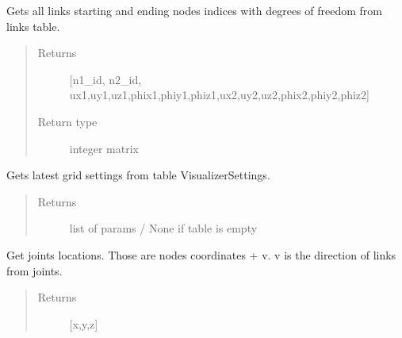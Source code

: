 \documentclass[letterpaper,10pt,english]{sphinxmanual}
\begin{document}
\begin{fulllineitems}
\begin{fulllineitems}
\end{fulllineitems}


\begin{fulllineitems}
\label{\detokenize{api:beamon.database.Database.get_edof_for_simulation}}
Gets all links starting and ending nodes indices with degrees of freedom from links table.
\begin{quote}\begin{description}
\item[{Returns}] \leavevmode
{[}n1\_id, n2\_id, ux1,uy1,uz1,phix1,phiy1,phiz1,ux2,uy2,uz2,phix2,phiy2,phiz2{]}

\item[{Return type}] \leavevmode
integer matrix

\end{description}\end{quote}

\end{fulllineitems}


\begin{fulllineitems}
\label{\detokenize{api:beamon.database.Database.get_grid_settings}}
Gets latest grid settings from table VisualizerSettings.
\begin{quote}\begin{description}
\item[{Returns}] \leavevmode
list of params / None if table is empty

\end{description}\end{quote}

\end{fulllineitems}


\begin{fulllineitems}
\label{\detokenize{api:beamon.database.Database.get_joints}}
Get joints locations. Those are nodes coordinates + v. v is the direction of links from joints.
\begin{quote}\begin{description}
\item[{Returns}] \leavevmode
{[}x,y,z{]}


\end{description}
\end{quote}
\end{fulllineitems}
\end{fulllineitems}
\end{document}
